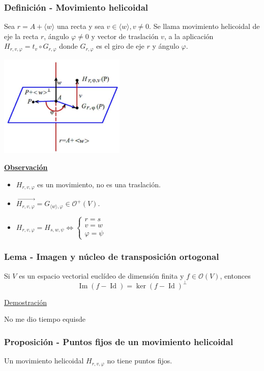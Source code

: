 \documentclass[12pt, a4paper, ones, notitlepage, openany,titlepage]{article}
\newcommand{\demostracion}{\noindent\underline{Demostración}}
\newcommand{\observacion}{\noindent\underline{\textbf{Observación}}}
\newcommand{\imagen}{\operatorname{Im}}
\newcommand{\identidad}{\operatorname{Id}}
\begin{document}
\subsubsection{Definición - Movimiento helicoidal}
Sea $r=A+\langle w\rangle$ una recta y sea $v \in\langle w\rangle, v \neq 0$. Se llama movimiento helicoidal de eje la recta $r$, ángulo $\varphi \neq 0$ y vector de traslación $v$, a la aplicación $H_{r, v, \varphi}=t_{v} \circ G_{r, \varphi}$ donde $G_{r, \varphi}$ es el giro de eje $r$ y ángulo $\varphi$.

\begin{center}
	\includegraphics[max width=6cm]{2023_05_02_d6703e6c81ebe4fb6eaag-084}
\end{center}

\observacion
\begin{itemize}
\item $H_{r, v, \varphi}$ es un movimiento, no es una 	traslación.
\item $\overrightarrow{H_{r, v, \varphi}} = G_{\langle w \rangle, \varphi} \in \mathcal{O}^+(V)$.
\item $\displaystyle H_{r, v, \varphi} = H_{s, w, \psi} \Longleftrightarrow \begin{cases}
	r = s \\
	v = w \\
	\varphi = \psi
\end{cases}$
\end{itemize}

\subsubsection{Lema - Imagen y núcleo de transposición ortogonal}
Si $V$ es un espacio vectorial euclídeo de dimensión finita y $f \in \mathcal{O}(V)$, entonces
$$
\imagen(f - \identidad) = \ker(f - \identidad)^\perp
$$

\demostracion

No me dio tiempo equisde

\subsubsection{Proposición - Puntos fijos de un movimiento helicoidal}
\noindent Un movimiento helicoidal $H_{r, v, \varphi}$ no tiene puntos fijos.
\end{document}
